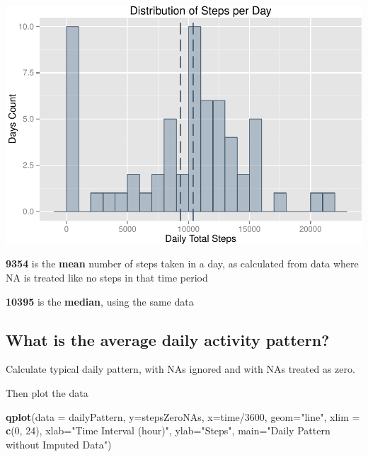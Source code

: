\documentclass[]{article}
\newenvironment{Shaded}{\begin{snugshade}}{\end{snugshade}}
\newcommand{\KeywordTok}[1]{\textcolor[rgb]{0.13,0.29,0.53}{\textbf{{#1}}}}
\newcommand{\DataTypeTok}[1]{\textcolor[rgb]{0.13,0.29,0.53}{{#1}}}
\newcommand{\DecValTok}[1]{\textcolor[rgb]{0.00,0.00,0.81}{{#1}}}
\newcommand{\StringTok}[1]{\textcolor[rgb]{0.31,0.60,0.02}{{#1}}}
\newcommand{\OtherTok}[1]{\textcolor[rgb]{0.56,0.35,0.01}{{#1}}}
\newcommand{\NormalTok}[1]{{#1}}
\begin{document}
\includegraphics{PA1_template_files/figure-latex/unnamed-chunk-1-1.pdf}

\textbf{9354} is the \textbf{mean} number of steps taken in a day, as
calculated from data where NA is treated like no steps in that time
period

\textbf{10395} is the \textbf{median}, using the same data

\subsection{What is the average daily activity
pattern?}\label{what-is-the-average-daily-activity-pattern}

Calculate typical daily pattern, with NAs ignored and with NAs treated
as zero.

\begin{Shaded}
\end{Shaded}

Then plot the data

\begin{Shaded}
\begin{Highlighting}[]
\KeywordTok{qplot}\NormalTok{(}\DataTypeTok{data =} \NormalTok{dailyPattern, }\DataTypeTok{y=}\NormalTok{stepsZeroNAs, }\DataTypeTok{x=}\NormalTok{time/}\DecValTok{3600}\NormalTok{, }\DataTypeTok{geom=}\StringTok{"line"}\NormalTok{, }
      \DataTypeTok{xlim =} \KeywordTok{c}\NormalTok{(}\DecValTok{0}\NormalTok{, }\DecValTok{24}\NormalTok{), }\DataTypeTok{xlab=}\StringTok{"Time Interval (hour)"}\NormalTok{, }\DataTypeTok{ylab=}\StringTok{"Steps"}\NormalTok{, }
      \DataTypeTok{main=}\StringTok{"Daily Pattern without Imputed Data"}\NormalTok{)}
\end{Highlighting}
\end{Shaded}
\end{document}
